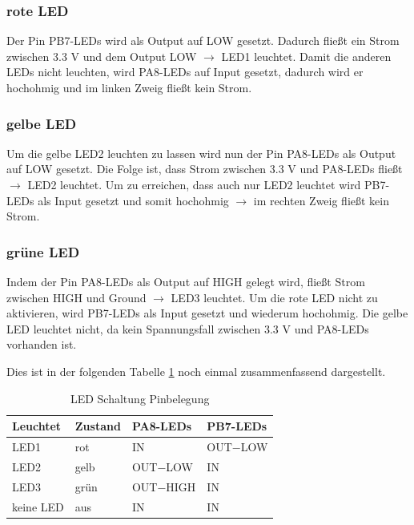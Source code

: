 \documentclass[a4paper,
DIV=13,
12pt,
BCOR=10mm,
department=FakEI,
parskip=half,
automark,
]{article}
\begin{document}
\subsubsection{rote LED}
Der Pin \glqq PB7-LEDs\grqq{} wird als Output auf \glqq LOW\grqq{} gesetzt. Dadurch fließt ein Strom zwischen 3.3 V und dem Output \glqq LOW\grqq{} $\rightarrow$ LED1 leuchtet. Damit die anderen LEDs nicht leuchten, wird \glqq PA8-LEDs\grqq{} auf Input gesetzt, dadurch wird er hochohmig und im linken Zweig fließt kein Strom.

\subsubsection{gelbe LED}
Um die gelbe LED2 leuchten zu lassen wird nun der Pin \glqq PA8-LEDs\grqq{} als Output auf \glqq LOW\grqq{} gesetzt. Die Folge ist, dass Strom zwischen 3.3 V und \glqq PA8-LEDs\grqq{} fließt $\rightarrow$ LED2 leuchtet. Um zu erreichen, dass auch nur LED2 leuchtet wird \glqq PB7-LEDs\grqq{} als Input gesetzt und somit hochohmig $\rightarrow$ im rechten Zweig fließt kein Strom.

\subsubsection{grüne LED}
Indem der Pin \glqq PA8-LEDs\grqq{} als Output auf \glqq HIGH\grqq{} gelegt wird, fließt Strom zwischen \glqq HIGH\grqq{} und Ground $\rightarrow$ LED3 leuchtet. Um die rote LED nicht zu aktivieren, wird \glqq PB7-LEDs\grqq{} als Input gesetzt und wiederum hochohmig. Die gelbe LED leuchtet nicht, da kein Spannungsfall zwischen 3.3 V und \glqq PA8-LEDs\grqq{} vorhanden ist.

Dies ist in der folgenden Tabelle \ref{tab:ZusammenfassungderFunktionsweisederLEDSchaltung} noch einmal zusammenfassend dargestellt.

\begin{table}[h]
\begin{center}
\begin{tabularx}{\columnwidth}{XXXl}
Leuchtet &Zustand &PA8-LEDs &PB7-LEDs \\ \hline
LED1 & rot & IN &OUT$-$LOW\\
LED2 & gelb & OUT$-$LOW &IN\\
LED3 & grün & OUT$-$HIGH & IN\\
keine LED & aus & IN & IN
\label{tab:ZusammenfassungderFunktionsweisederLEDSchaltung}
\end{tabularx}
\end{center}
\caption{LED Schaltung Pinbelegung}
\end{table}
\end{document}
